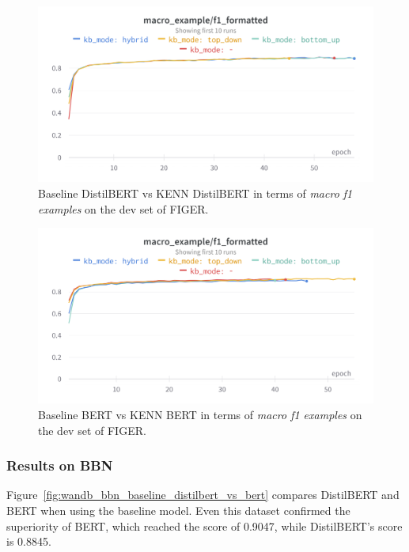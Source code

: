 \begin{figure}[bth]
    \centering
    \includegraphics[width=.8\linewidth]{figures/wandb_figer_kenn_distilbert.png}
    \caption{Baseline DistilBERT vs KENN DistilBERT in terms of \textit{macro f1 examples} on the dev set of FIGER.}
    \label{fig:wandb_figer_kenn_distilbert}
\end{figure}

\begin{figure}[bth]
    \centering
    \includegraphics[width=.8\linewidth]{figures/wandb_figer_kenn_bert.png}
    \caption{Baseline BERT vs KENN BERT in terms of \textit{macro f1 examples} on the dev set of FIGER.}
    \label{fig:wandb_figer_kenn_bert}
\end{figure}




\subsubsection{Results on BBN}
Figure~\ref{fig:wandb_bbn_baseline_distilbert_vs_bert} compares DistilBERT and BERT when using the baseline model. Even this dataset confirmed the superiority of BERT, which reached the score of 0.9047, while DistilBERT's score is 0.8845.

